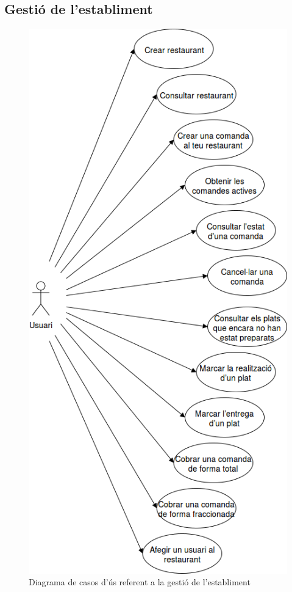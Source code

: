 \clearpage
\subsection{Gestió de l'establiment}
\begin{figure}[H]
\centering
\includegraphics[scale=0.6]{Figures/casosUs_gestioEstabliment.png}
\caption{Diagrama de casos d'ús referent a la gestió de l'establiment}
\end{figure}

